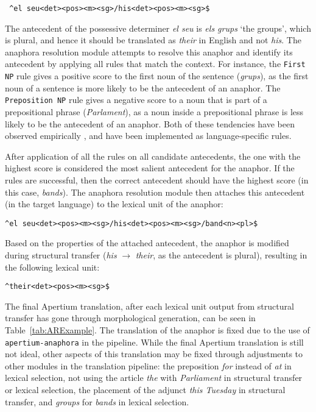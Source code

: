 \documentclass[free]{flammie}
\newcommand{\examp}[1]{\emph{#1}}
\begin{document}
\begin{verbatim} ^el seu<det><pos><m><sg>/his<det><pos><m><sg>$ \end{verbatim}

The antecedent of the possessive determiner \textit{el seu} is \textit{els
grups} `the groups', which is plural, and hence it should be translated as
\textit{their} in English and not \textit{his}.  The anaphora resolution module
attempts to resolve this anaphor and identify its antecedent by applying all
rules that match the context.  For instance, the \texttt{First NP} rule gives a
positive score to the first noun of the sentence (\textit{grups}), as the first
noun of a sentence is more likely to be the antecedent of an anaphor. The
\texttt{Preposition NP} rule gives a negative score to a noun that is part of a
prepositional phrase (\textit{Parlament}), as a noun inside a prepositional
phrase is less likely to be the antecedent of an anaphor. Both of these
tendencies have been observed empirically \cite{mitkov1999multilingual}, and
have been implemented as language-specific rules.

After application of all the rules on all candidate antecedents, the one with
the highest score is considered the most salient antecedent for the anaphor.  If
the rules are successful, then the correct antecedent should have the highest
score (in this case, \textit{bands}).  The anaphora resolution module then
attaches this antecedent (in the target language) to the lexical unit of the
anaphor:

\begin{verbatim}
^el seu<det><pos><m><sg>/his<det><pos><m><sg>/band<n><pl>$
\end{verbatim}

Based on the properties of the attached antecedent, the anaphor is modified
during structural transfer (\textit{his} $\rightarrow$ \textit{their}, as the
antecedent is plural), resulting in the following lexical unit:

\begin{verbatim}
^their<det><pos><m><sg>$
\end{verbatim}

The final Apertium translation, after each lexical unit output from structural
transfer has gone through morphological generation, can be seen in
Table~\ref{tab:ARExample}. The translation of the anaphor is fixed due to the
use of \texttt{apertium-anaphora} in the pipeline. While the final Apertium
translation is still not ideal, other aspects of this translation may be fixed
through adjustments to other modules in the translation pipeline: the
preposition \examp{for} instead of \examp{at} in lexical selection, not using
the article \examp{the} with \examp{Parliament} in structural transfer or
lexical selection, the placement of the adjunct \examp{this Tuesday} in
structural transfer, and \examp{groups} for \examp{bands} in lexical selection.
\end{document}
